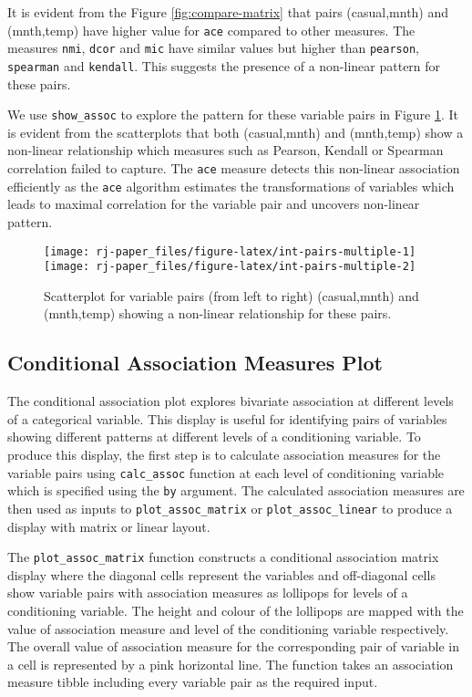 It is evident from the Figure \ref{fig:compare-matrix} that pairs (casual,mnth) and (mnth,temp) have higher value for \texttt{ace} compared to other measures. The measures \texttt{nmi}, \texttt{dcor} and \texttt{mic} have similar values but higher than \texttt{pearson}, \texttt{spearman} and \texttt{kendall}. This suggests the presence of a non-linear pattern for these pairs.

We use \texttt{show\_assoc} to explore the pattern for these variable pairs in Figure \ref{fig:int-pairs-multiple}. It is evident from the scatterplots that both (casual,mnth) and (mnth,temp) show a non-linear relationship which measures such as Pearson, Kendall or Spearman correlation failed to capture. The \texttt{ace} measure detects this non-linear association efficiently as the \texttt{ace} algorithm estimates the transformations of variables which leads to maximal correlation for the variable pair and uncovers non-linear pattern.

\begin{figure}
\texttt{[image: rj-paper\_files/figure-latex/int-pairs-multiple-1]} \texttt{[image: rj-paper\_files/figure-latex/int-pairs-multiple-2]} \caption{Scatterplot for variable pairs (from left to right) (casual,mnth) and (mnth,temp) showing a non-linear relationship for these pairs.}\label{fig:int-pairs-multiple}
\end{figure}

\hypertarget{conditional-association-measures-plot}{%
\subsection{Conditional Association Measures Plot}\label{conditional-association-measures-plot}}

The conditional association plot explores bivariate association at different levels of a categorical variable. This display is useful for identifying pairs of variables showing different patterns at different levels of a conditioning variable. To produce this display, the first step is to calculate association measures for the variable pairs using \texttt{calc\_assoc} function at each level of conditioning variable which is specified using the \texttt{by} argument. The calculated association measures are then used as inputs to \texttt{plot\_assoc\_matrix} or \texttt{plot\_assoc\_linear} to produce a display with matrix or linear layout.

The \texttt{plot\_assoc\_matrix} function constructs a conditional association matrix display where the diagonal cells represent the variables and off-diagonal cells show variable pairs with association measures as lollipops for levels of a conditioning variable. The height and colour of the lollipops are mapped with the value of association measure and level of the conditioning variable respectively. The overall value of association measure for the corresponding pair of variable in a cell is represented by a pink horizontal line. The function takes an association measure tibble including every variable pair as the required input.

